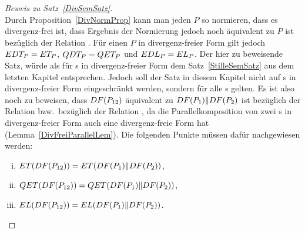 \begin{proof}[Beweis zu Satz~\ref{DivSemSatz}]\mbox{}\\
  Durch Proposition~\ref{DivNormProp} kann man jeden \MEIO{} $P$ so normieren,
  dass es divergenz-frei ist, dass Ergebnis der Normierung jedoch noch
  äquivalent zu $P$ ist bezüglich der Relation \DRel{}. Für einen \MEIO{} $P$
  in divergenz-freier Form gilt jedoch $EDT _P = ET _P$, $QDT _P = QET _P$
  und $EDL _P = EL _P$. Der hier zu beweisende Satz, würde als für \MEIO{}s
  in divergenz-freier Form dem Satz~\ref{StilleSemSatz} aus dem letzten Kapitel
  entsprechen. Jedoch soll der Satz in diesem Kapitel nicht auf \MEIO{}s in
  divergenz-freier Form eingeschränkt werden, sondern für alle \MEIO{}s gelten.
  Es ist also noch zu beweisen, dass $DF (P_{12})$ äquivalent zu $DF
  (P_1)\|DF (P_2)$ ist bezüglich der Relation \DRel{} bzw.\ bezüglich der
  Relation \QRel{}, da die Parallelkomposition von zwei \MEIO{}s in
  divergenz-freier Form auch eine divergenz-freie Form hat
  (Lemma~\ref{DivFreiParallelLem}). Die folgenden Punkte müssen dafür
  nachgewiesen werden:
  \begin{enumerate}[(i)]
    \item $ET (DF (P_{12})) = ET (DF (P_1)\|DF (P_2))$,
    \item $QET (DF (P_{12})) = QET (DF (P_1)\|DF (P_2))$,
    \item $EL (DF (P_{12})) = EL (DF (P_1)\|DF (P_2))$.
  \end{enumerate}


\end{proof}
